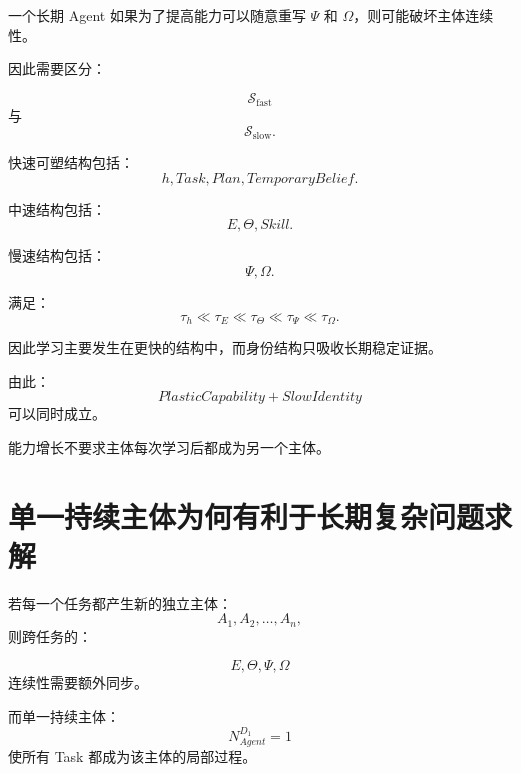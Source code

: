 一个长期 Agent 如果为了提高能力可以随意重写 $\Psi$ 和 $\Omega$，则可能破坏主体连续性。

因此需要区分：

\begin{equation}
\mathcal S_{\mathrm{fast}}
\end{equation}
与
\begin{equation}
\mathcal S_{\mathrm{slow}}.
\end{equation}

快速可塑结构包括：
\begin{equation}
h,
Task,
Plan,
TemporaryBelief.
\end{equation}

中速结构包括：
\begin{equation}
E,
\Theta,
Skill.
\end{equation}

慢速结构包括：
\begin{equation}
\Psi,
\Omega.
\end{equation}

满足：
\begin{equation}
\tau_h
\ll
\tau_E
\ll
\tau_\Theta
\ll
\tau_\Psi
\ll
\tau_\Omega.
\end{equation}

因此学习主要发生在更快的结构中，而身份结构只吸收长期稳定证据。

由此：
\begin{equation}
\boxed{
PlasticCapability
+
SlowIdentity
}
\end{equation}
可以同时成立。

能力增长不要求主体每次学习后都成为另一个主体。

\section{单一持续主体为何有利于长期复杂问题求解}

若每一个任务都产生新的独立主体：
\begin{equation}
A_1,A_2,\ldots,A_n,
\end{equation}
则跨任务的：

\begin{equation}
E,
\Theta,
\Psi,
\Omega
\end{equation}
连续性需要额外同步。

而单一持续主体：
\begin{equation}
N_{Agent}^{D_1}=1
\end{equation}
使所有 Task 都成为该主体的局部过程。

